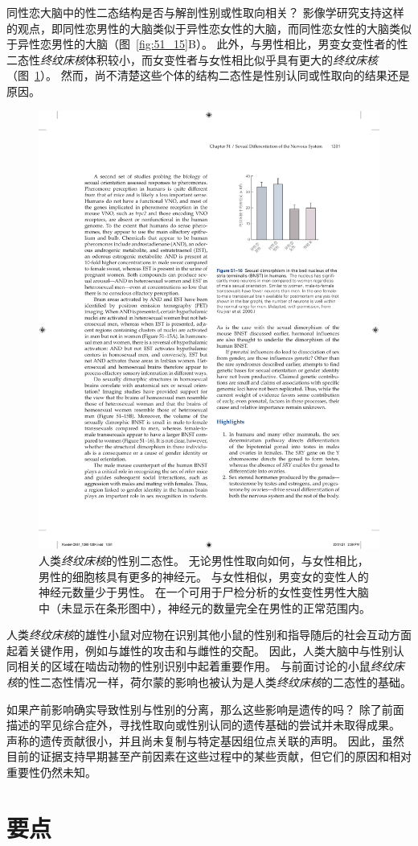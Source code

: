 同性恋大脑中的性二态结构是否与解剖性别或性取向相关？
影像学研究支持这样的观点，即同性恋男性的大脑类似于异性恋女性的大脑，而同性恋女性的大脑类似于异性恋男性的大脑（图~\ref{fig:51_15}B）。
此外，与男性相比，男变女变性者的性二态性\textit{终纹床核}体积较小，而女变性者与女性相比似乎具有更大的\textit{终纹床核}（图~\ref{fig:51_16}）。
然而，尚不清楚这些个体的结构二态性是性别认同或性取向的结果还是原因。


\begin{figure}[htbp]
	\centering
	\includegraphics[width=0.51\linewidth]{chap51/fig_51_16}
	\caption{人类\textit{终纹床核}的性别二态性。
		无论男性性取向如何，与女性相比，男性的细胞核具有更多的神经元。
		与女性相似，男变女的变性人的神经元数量少于男性。
		在一个可用于尸检分析的女性变性男性大脑中（未显示在条形图中），神经元的数量完全在男性的正常范围内\cite{kruijver2000male}。}
	\label{fig:51_16}
\end{figure}


人类\textit{终纹床核}的雄性小鼠对应物在识别其他小鼠的性别和指导随后的社会互动方面起着关键作用，例如与雄性的攻击和与雌性的交配。
因此，人类大脑中与性别认同相关的区域在啮齿动物的性别识别中起着重要作用。
与前面讨论的小鼠\textit{终纹床核}的性二态性情况一样，荷尔蒙的影响也被认为是人类\textit{终纹床核}的二态性的基础。


如果产前影响确实导致性别与性别的分离，那么这些影响是遗传的吗？
除了前面描述的罕见综合症外，寻找性取向或性别认同的遗传基础的尝试并未取得成果。
声称的遗传贡献很小，并且尚未复制与特定基因组位点关联的声明。
因此，虽然目前的证据支持早期甚至产前因素在这些过程中的某些贡献，但它们的原因和相对重要性仍然未知。


\section{要点}

